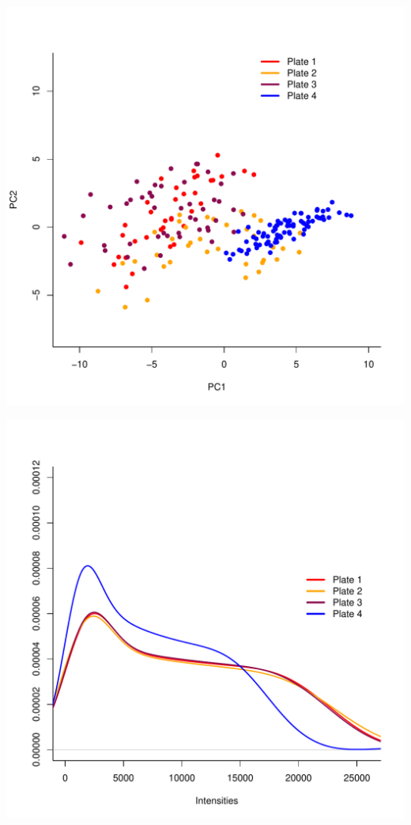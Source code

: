 \documentclass[12pt]{article}
\begin{document}
\begin{knitrout}
\includegraphics[width=\maxwidth]{figure/unnamed-chunk-52} 

\includegraphics[width=\maxwidth]{figure/unnamed-chunk-53} 

\end{knitrout}
\end{document}
